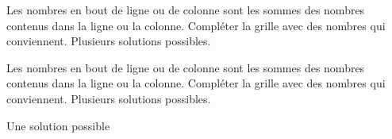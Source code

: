 \begin{exercice}[Yohaku]
  Les nombres en bout de ligne ou de colonne sont les sommes des nombres contenus dans la ligne ou la colonne.
  Compléter la grille avec des nombres qui conviennent. Plusieurs solutions possibles.
  \begin{center}
  \end{center}

 \end{exercice}
\begin{corrige}  
    Les nombres en bout de ligne ou de colonne sont les sommes des nombres contenus dans la ligne ou la colonne.
    Compléter la grille avec des nombres qui conviennent. Plusieurs solutions possibles.

    {\red Une solution possible}

    \medskip
    \begin{center}
    \end{center} 
\end{corrige}